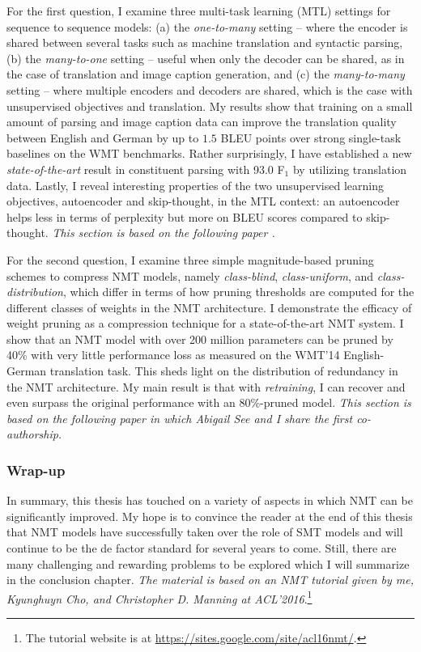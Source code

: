 For the first question, 
I examine three multi-task learning (MTL) settings for sequence to sequence
models:
(a) the {\it one-to-many} setting -- where the encoder is shared
between several tasks such as machine translation and
syntactic parsing, (b) the {\it many-to-one} setting -- useful when only the
decoder can be shared, as in the case of 
translation and image caption generation, and (c) the {\it
  many-to-many} setting -- where multiple encoders and decoders are
shared, which is the case with unsupervised objectives
and translation.  My results show that training on a small amount of parsing and
image caption data can improve the translation quality between English and
German by up to $1.5$ BLEU
points over strong single-task baselines on the WMT benchmarks. Rather
surprisingly,
I have established a new {\it
state-of-the-art} result in constituent parsing with 93.0 F$_1$ by utilizing
translation data. Lastly, I reveal interesting properties of the two unsupervised learning
objectives, autoencoder and skip-thought, in the MTL context: an autoencoder helps less in terms of
perplexity but more on BLEU scores compared to skip-thought.
{\it This section is based on the following paper \cite{luong16iclr}.}

For the second question, I examine three simple magnitude-based pruning schemes to compress NMT models, namely {\it class-blind}, {\it class-uniform}, and {\it class-distribution}, which differ in terms of how pruning thresholds are computed for the different classes of weights in the NMT architecture.
I demonstrate the efficacy of weight pruning as a compression technique for a state-of-the-art NMT system. 
I show that an NMT model with over 200 million parameters can be pruned by 40\% with very little performance loss as measured on the WMT'14 English-German translation task. 
This sheds light on the distribution of redundancy in the NMT architecture.
My main result is that with {\it retraining}, I can recover and even surpass the original performance with an 80\%-pruned model. 
{\it This section is based on the following paper \cite{see16} in which
Abigail See and I share the first co-authorship.}

\subsubsection{Wrap-up} 
In summary, this thesis has touched on a variety of aspects in which NMT can be
significantly improved. My hope is to convince the reader 
at the end of this thesis that NMT models have successfully taken over the role
of SMT models and will continue to be the de factor standard for several years
to come. Still, there are many challenging and rewarding problems to be explored
which I will summarize in the conclusion chapter. {\it The material is based on an
NMT tutorial given by me, Kyunghuyn Cho, and Christopher D. Manning at
ACL'2016}.\footnote{The tutorial website is
at \url{https://sites.google.com/site/acl16nmt/}.}

